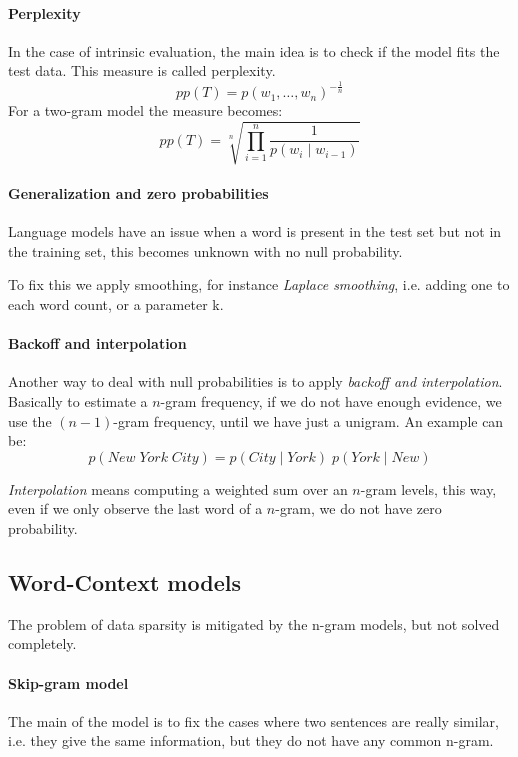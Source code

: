 \paragraph{Perplexity}
In the case of intrinsic evaluation, the main idea
 is to check if the model fits the test data. 
This measure is called perplexity.
$$\mathit{pp}(T) = p(w_1, \dots, w_n)^{-\frac{1}{n}}$$
For a two-gram model the measure becomes:
$$\mathit{pp}(T)= \sqrt[n]{\prod_{i=1}^n \frac{1}{p(w_i\;|\;w_{i-1})}}$$

\paragraph{Generalization and zero probabilities}
Language models have an issue when a word is present in the test set 
but not in the training set, this becomes unknown with no null probability.

To fix this we apply smoothing, for instance \emph{Laplace smoothing}, i.e. 
adding one to each word count, or a parameter k.

\paragraph{Backoff and interpolation}
Another way to deal with null probabilities 
is to apply \emph{backoff and interpolation}. Basically to estimate 
a $n$-gram frequency, if we do not have enough evidence, we use the $(n-1)$-gram 
frequency, until we have just a unigram.
An example can be:
$$p(\mathit{New\;York\;City}) = p(\mathit{City}\;|\;\mathit{York})\;p(\mathit{York}\;|\;\mathit{New}) $$

\emph{Interpolation} means computing a weighted sum over an $n$-gram levels, 
this way, even if we only observe the last word of a $n$-gram, we do not 
have zero probability.

\subsection{Word-Context models}
The problem of data sparsity is mitigated by the n-gram models, but not 
solved completely.

\paragraph{Skip-gram model}
The main of the model is to fix the cases where two sentences
are really similar, i.e. they give the same information, but they do 
not have any common n-gram.

